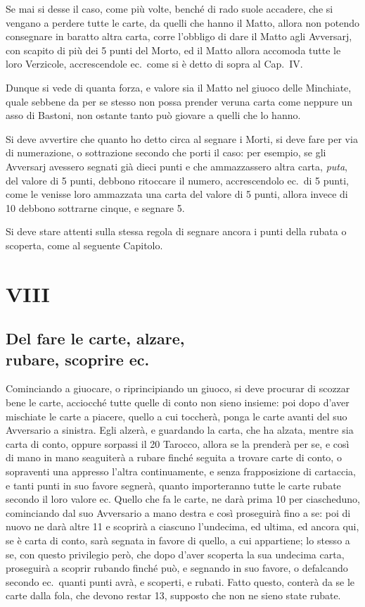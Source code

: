 \documentclass[11pt,a6paper]{article}
\begin{document}
Se mai si desse il caso, come più volte, benché di rado suole accadere, che si vengano a perdere tutte le carte, da quelli che hanno il Matto, allora non potendo consegnare in baratto altra carta, corre l'obbligo di dare il Matto agli Avversarj, con scapito di più dei 5 punti del Morto, ed il Matto allora accomoda tutte le loro Verzicole, accrescendole ec.\ come si è detto di sopra al Cap.\ IV.

Dunque si vede di quanta forza, e
valore sia il Matto nel giuoco delle Minchiate, quale sebbene da per se stesso non possa prender veruna carta come neppure un asso di Bastoni, non ostante tanto può giovare a quelli che lo hanno.

Si deve avvertire che quanto ho detto circa al segnare i Morti, si deve fare per via di numerazione, o sottrazione secondo che porti il caso: per esempio, se gli Avversarj avessero segnati già dieci punti e che ammazzassero altra carta, \textit{puta}, del valore di 5 punti, debbono ritoccare il numero, accrescendolo ec.\ di 5 punti, come le venisse loro ammazzata una carta del valore di 5 punti, allora invece di 10 debbono sottrarne cinque, e segnare 5.

Si deve stare attenti sulla stessa regola di segnare ancora i punti della rubata o scoperta, come al seguente Capitolo.

\section{VIII}
\subsection*{Del fare le carte, alzare, \\ rubare, scoprire ec.}

Cominciando a giuocare, o riprincipiando
un giuoco, si deve procurar 
di scozzar bene le carte, acciocché tutte 
quelle di conto non sieno insieme: poi 
dopo d'aver mischiate le carte a piacere, 
quello a cui toccherà, ponga le carte 
avanti del suo Avversario a sinistra. Egli 
alzerà, e guardando la carta, che ha alzata, mentre sia carta di conto, oppure 
sorpassi il 20 Tarocco, allora se la prenderà
per se, e così di mano in mano seaguiterà a rubare finché seguita a trovare 
carte di conto, o sopraventi una appresso 
l'altra continuamente, e senza frapposizione 
di cartaccia, e tanti punti in suo favore 
segnerà, quanto importeranno tutte le carte rubate secondo il loro valore ec. Quello
che fa le carte, ne darà prima 10 per 
ciascheduno, cominciando dal suo Avversario
a mano destra e così proseguirà 
fino a se: poi di nuovo ne darà altre 11 e scoprirà a ciascuno l'undecima, ed ultima, ed ancora qui, se è carta di conto, sarà segnata in favore di quello, a cui appartiene; lo stesso a se, con questo privilegio però, che dopo d'aver scoperta la sua undecima carta, proseguirà a scoprir rubando finché può, e segnando in suo favore, o defalcando secondo ec.\ quanti punti avrà, e scoperti, e rubati. Fatto questo, conterà da se le carte dalla fola, che devono restar 13, supposto che non ne sieno state rubate.
\end{document}
